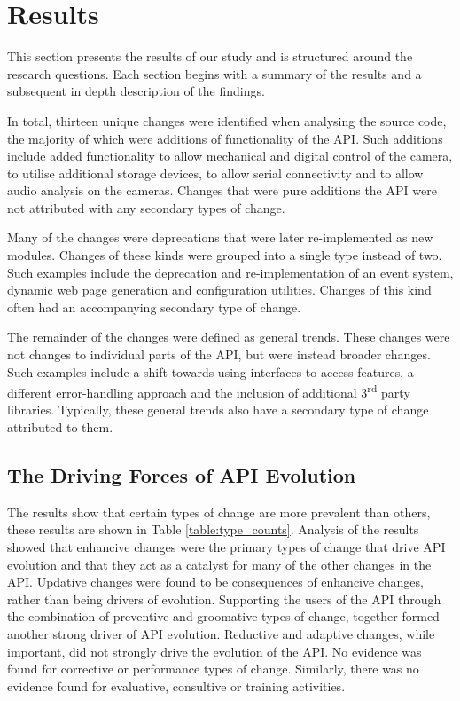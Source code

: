 \documentclass{sig-alternate}
\begin{document}
\newpage
\section{Results} \label{results} 

This section presents the results of our study and is structured around the research questions. Each section begins with a summary of the results and a subsequent in depth description of the findings.

In total, thirteen unique changes were identified when analysing the source code, the majority of which were additions of functionality of the API. Such additions include added functionality to allow mechanical and digital control of the camera, to utilise additional storage devices, to allow serial connectivity and to allow audio analysis on the cameras. Changes that were pure additions the API were not attributed with any secondary types of change.

Many of the changes were deprecations that were later re-implemented as new modules. Changes of these kinds were grouped into a single type instead of two. Such examples include the deprecation and re-implementation of an event system, dynamic web page generation and configuration utilities. Changes of this kind often had an accompanying secondary type of change.

The remainder of the changes were defined as general trends. These changes were not changes to individual parts of the API, but were instead broader changes. Such examples include a shift towards using interfaces to access features, a different error-handling approach and the inclusion of additional 3\textsuperscript{rd} party libraries. Typically, these general trends also have a secondary type of change attributed to them.



\subsection{The Driving Forces of API Evolution} \label{results_rq1}

The results show that certain types of change are more prevalent than others, these results are shown in Table \ref{table:type_counts}. Analysis of the results showed that enhancive changes were the primary types of change that drive API evolution and that they act as a catalyst for many of the other changes in the API. Updative changes were found to be consequences of enhancive changes, rather than being drivers of evolution. Supporting the users of the API through the combination of preventive and groomative types of change, together formed another strong driver of API evolution. Reductive and adaptive changes, while important, did not strongly drive the evolution of the API. No evidence was found for corrective or performance types of change. Similarly, there was no evidence found for evaluative, consultive or training activities.    
\end{document}
